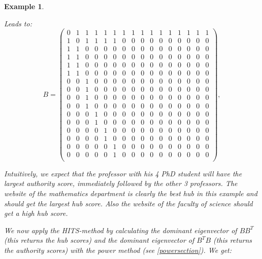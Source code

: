 \documentclass[a4paper,11pt]{report}
\newtheorem{example}[theorem]{Example}
\begin{document}
\begin{example}
\begin{itemize}
\end{itemize}
Leads to:
$$
 B= \begin{pmatrix} 
0 & 1 & 1 & 1 & 1 & 1 & 1 & 1 & 1 & 1 & 1  & 1 & 1 & 1 & 1 & 1\\
1 & 0 & 1 & 1 & 1 & 1 & 0 & 0 & 0 & 0 & 0 & 0 & 0 & 0 & 0 & 0 \\
1 & 1 & 0 & 0 & 0 & 0 & 0 & 0 & 0 & 0 & 0 & 0 & 0 & 0 & 0 & 0 \\
1 & 1 & 0 & 0 & 0 & 0 & 0 & 0 & 0 & 0 & 0 & 0 & 0 & 0 & 0 & 0 \\
1 & 1 & 0 & 0 & 0 & 0 & 0 & 0 & 0 & 0 & 0 & 0 & 0 & 0 & 0 & 0 \\
1 & 1 & 0 & 0 & 0 & 0 & 0 & 0 & 0 & 0 & 0 & 0 & 0 & 0 & 0 & 0 \\
0 & 0 & 1 & 0 & 0 & 0 & 0 & 0 & 0 & 0 & 0 & 0 & 0 & 0 & 0 & 0 \\
0 & 0 & 1 & 0 & 0 & 0 & 0 & 0 & 0 & 0 & 0 & 0 & 0 & 0 & 0 & 0 \\
0 & 0 & 1 & 0 & 0 & 0 & 0 & 0 & 0 & 0 & 0 & 0 & 0 & 0 & 0 & 0 \\
0 & 0 & 1 & 0 & 0 & 0 & 0 & 0 & 0 & 0 & 0 & 0 & 0 & 0 & 0 & 0 \\
0 & 0 & 0 & 1 & 0 & 0 & 0 & 0 & 0 & 0 & 0 & 0 & 0 & 0 & 0 & 0 \\
0 & 0 & 0 & 1 & 0 & 0 & 0 & 0 & 0 & 0 & 0 & 0 & 0 & 0 & 0 & 0 \\
0 & 0 & 0 & 0 & 1 & 0 & 0 & 0 & 0 & 0 & 0 & 0 & 0 & 0 & 0 & 0 \\
0 & 0 & 0 & 0 & 1 & 0 & 0 & 0 & 0 & 0 & 0 & 0 & 0 & 0 & 0 & 0 \\
0 & 0 & 0 & 0 & 0 & 1 & 0 & 0 & 0 & 0 & 0 & 0 & 0 & 0 & 0 & 0 \\
0 & 0 & 0 & 0 & 0 & 1 & 0 & 0 & 0 & 0 & 0 & 0 & 0 & 0 & 0 & 0 \\
\end{pmatrix},$$

Intuitively, we expect that the professor with his 4 PhD 
student will have the largest authority score, immediately followed by the other 3 professors.
The website of the mathematics department is clearly the best hub in this example and should get the largest hub score.
Also the website of the faculty of science should get a high hub score.

We now apply the HITS-method by
calculating the dominant eigenvector of $BB^T$ (this returns the hub scores) 
and the dominant eigenvector of $B^TB$ (this returns the authority scores) with 
the power method (see \ref{powersection}). We get:



\end{example}
\end{document}
